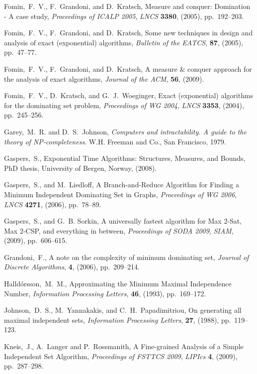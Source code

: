 \documentclass[a4paper,10pt]{article}
\theoremstyle{plain}
\theoremstyle{definition}
\theoremstyle{remark}
\begin{document}
\begin{thebibliography}{99}
Fomin,~F.~V., F.~Grandoni, and D.~Kratsch,
Measure and conquer: Domination - A case study,
{\em Proceedings of ICALP 2005\/}, {\em LNCS\/}
{\bf 3380}, (2005), pp.~192--203.

Fomin,~F.~V., F.~Grandoni, and D.~Kratsch,
Some new techniques in design and analysis of exact (exponential) algorithms,
{\em Bulletin of the EATCS\/}, {\bf 87}, (2005), pp.~47--77.

Fomin,~F.~V., F.~Grandoni, and D.~Kratsch,
A measure {\&} conquer approach for the analysis of exact algorithms,
{\em Journal of the ACM\/}, {\bf 56}, (2009).

 
Fomin,~F.~V., D.~Kratsch, and G.~J.~Woeginger,
Exact (exponential) algorithms for the dominating set problem,
{\em Proceedings of WG 2004\/}, {\em LNCS\/}
{\bf 3353}, (2004), pp.~245--256.

Garey,~M.~R. and D.~S.~Johnson,
{\em Computers and intractability. A guide to the theory
of NP-completeness}.
W.H. Freeman and Co., San Francisco, 1979.

Gaspers,~S.,
Exponential Time Algorithms: Structures, Measures, and Bounds,
PhD thesis, University of Bergen, Norway, (2008).



Gaspers,~S., and M.~Liedloff,
A Branch-and-Reduce Algorithm for Finding a Minimum Independent Dominating Set in Graphs,
{\em Proceedings of WG 2006\/}, {\em LNCS\/}
{\bf 4271}, (2006), pp.~78--89.

Gaspers,~S., and G.~B. Sorkin,
A universally fastest algorithm for Max 2-Sat, Max 2-CSP, and everything in between,
{\em Proceedings of SODA 2009\/}, {\em SIAM\/}, (2009), pp.~606--615.

Grandoni,~F.,
A note on the complexity of minimum dominating set,
{\em Journal of Discrete Algorithms\/},
{\bf 4}, (2006), pp.~209--214.

Halld\'orsson,~M.~M.,
Approximating the Minimum Maximal Independence Number,
{\em Information Processing Letters\/},
{\bf 46}, (1993), pp.~169--172.

Johnson,~D.~S., M.~Yannakakis, and C.~H.~Papadimitriou,
On generating all maximal independent sets,
{\em Information Processing Letters\/},
{\bf 27}, (1988), pp.~119--123.

Kneis,~J., A.~Langer and P.~Rossmanith,
A Fine-grained Analysis of a Simple Independent Set Algorithm,
{\em Proceedings of FSTTCS 2009\/}, {\em LIPIcs\/}
{\bf 4}, (2009), pp.~287--298.


\end{thebibliography}
\end{document}
